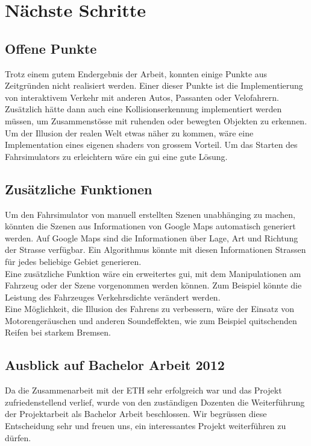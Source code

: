 \section{Nächste Schritte}
\subsection{Offene Punkte}
Trotz einem gutem Endergebnis der Arbeit, konnten einige Punkte aus Zeitgründen nicht realisiert werden. Einer dieser Punkte ist die Implementierung von interaktivem Verkehr mit anderen Autos, Passanten oder Velofahrern. Zusätzlich hätte dann auch eine Kollisionserkennung implementiert werden müssen, um Zusammenstösse mit ruhenden oder bewegten Objekten zu erkennen. Um der Illusion der realen Welt etwas näher zu kommen, wäre eine Implementation eines eigenen \glspl{shader} von grossem Vorteil. Um das Starten des Fahrsimulators zu erleichtern wäre ein \gls{gui} eine gute Lösung.
\subsection{Zusätzliche Funktionen}
Um den Fahrsimulator von manuell erstellten Szenen unabhänging zu machen, könnten die Szenen aus Informationen von Google Maps automatisch generiert werden. Auf Google Maps sind die Informationen über Lage, Art und Richtung der Strasse verfügbar. Ein Algorithmus könnte mit diesen Informationen Strassen für jedes beliebige Gebiet generieren.\\
Eine zusätzliche Funktion wäre ein erweitertes \gls{gui}, mit dem Manipulationen am Fahrzeug oder der Szene vorgenommen werden können. Zum Beispiel könnte die Leistung des Fahrzeuges Verkehrsdichte verändert werden.\\
Eine Möglichkeit, die Illusion des Fahrens zu verbessern, wäre der Einsatz von Motorengeräuschen und anderen Soundeffekten, wie zum Beispiel quitschenden Reifen bei starkem Bremsen.
\subsection{Ausblick auf Bachelor Arbeit 2012}
Da die Zusammenarbeit mit der ETH sehr erfolgreich war und das Projekt zufriedenstellend verlief, wurde von den zuständigen Dozenten die Weiterführung der Projektarbeit als Bachelor Arbeit beschlossen. Wir begrüssen diese Entscheidung sehr und freuen uns, ein interessantes Projekt weiterführen zu dürfen.

